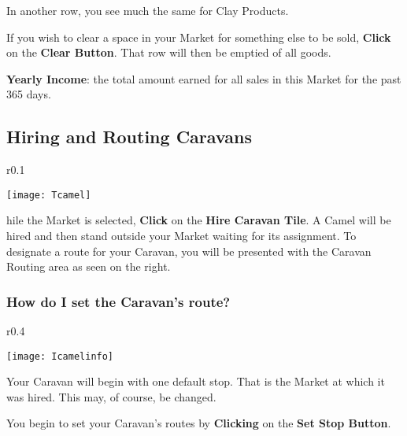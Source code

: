 In another row, you see much the same for Clay Products.

If you wish to clear a space in your Market for something else to be sold, \textbf{Click} on the \textbf{Clear Button}. That row will then be emptied of all goods.

\textbf{Yearly Income}: the total amount earned for all sales in this Market for the past 365 days.

\subsection{Hiring and Routing Caravans}

\begin{wrapfigure}{r}{0.1\textwidth}
	\vspace{-20pt}
	\begin{center}
		\texttt{[image: Tcamel]} %
	\end{center}
	\vspace{-20pt}
\end{wrapfigure}


hile the Market is selected, \textbf{Click} on the \textbf{Hire Caravan Tile}. A Camel will be hired and then stand outside your Market waiting for its assignment. To designate a route for your Caravan, you will be presented with the Caravan Routing area as seen on the right.

\subsubsection{How do I set the Caravan’s route?}

\begin{wrapfigure}{r}{0.4\textwidth}
	\vspace{-20pt}
	\begin{center}
		\texttt{[image: Icamelinfo]} %
	\end{center}
	\vspace{-20pt}
\end{wrapfigure}

Your Caravan will begin with one default stop. That is the Market at which it was hired. This may, of course, be changed.

You begin to set your Caravan’s routes by \textbf{Clicking} on the \textbf{Set Stop Button}.

